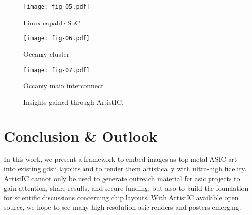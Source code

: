 \documentclass[a4paper, 10pt, unnumberedsections, twoside]{LTJournalArticle}
\newcommand{\artistic}{ArtistIC}
\begin{document}
\begin{figure}
    \begin{subcaptionblock}{0.45\linewidth}
        \centering%
        \texttt{[image: fig-05.pdf]}%
        \vspace{-0.3em}%
        \caption{Linux-capable SoC~\cite{sauter2024insights}}%
        \label{fig:artistic_iguana}%
    \end{subcaptionblock}\hfill
    \begin{subcaptionblock}{0.508\linewidth}%
        \centering%
        \texttt{[image: fig-06.pdf]}%
        \vspace{-0.3em}%
        \caption{Occamy cluster~\cite{scheffler2025occamy}}%
        \label{fig:artistic_cluster}%
    \end{subcaptionblock}\hfill
    \begin{subcaptionblock}{\linewidth}
        \centering%
        \texttt{[image: fig-07.pdf]}%
        \vspace{-0.3em}%
        \caption{Occamy main interconnect~\cite{scheffler2025occamy}}%
        \label{fig:artistic_ico}%
    \end{subcaptionblock}\hfill

    \caption{Insights gained through {\artistic}.}
    \label{fig:case}
\end{figure}

\section{Conclusion \& Outlook}

In this work, we present a framework to embed images as top-metal ASIC art into existing \gls{gdsii} layouts and to render them artistically with ultra-high fidelity.
{\artistic} cannot only be used to generate outreach material for \gls{asic} projects to gain attention, share results, and secure funding, but also to build the foundation for scientific discussions concerning chip layouts.
%
With {\artistic} available open source, we hope to see many high-resolution \gls{asic} renders and posters emerging.


\printbibliography
\end{document}
